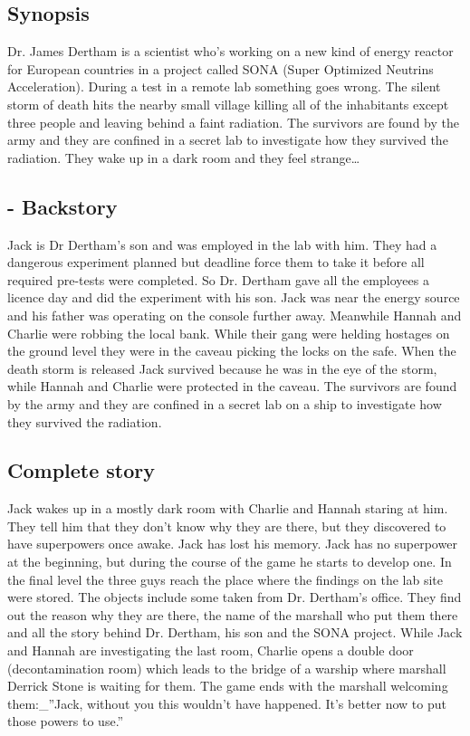 \subsection{Synopsis}
Dr. James Dertham is a scientist who's working on a new kind of energy reactor for European countries in a project called SONA (Super Optimized Neutrins Acceleration). During a test in a remote lab something goes wrong. The silent storm of death hits the nearby small village killing all of the inhabitants except three people and leaving behind a faint radiation.  The survivors are found by the army and they are confined in a secret lab to investigate how they survived the radiation.
They wake up in a dark room and they feel strange… 

\subsection{- Backstory}
Jack is Dr Dertham’s son and was employed in the lab with him. They had a dangerous experiment planned but deadline force them to take it before all required pre-tests were completed. So Dr. Dertham gave all the employees a licence day and did the experiment with his son. Jack was near the energy source and his father was operating on the console further away. Meanwhile Hannah and Charlie were robbing the local bank. While their gang were helding hostages on the ground level they were in the caveau picking the locks on the safe.
When the death storm is released Jack survived because he was in the eye of the storm, while Hannah and Charlie were protected in the caveau. 
The survivors are found by the army and they are confined in a secret lab on a ship to investigate how they survived the radiation.

\subsection{Complete story}
Jack wakes up in a mostly dark room with Charlie and Hannah staring at him. They tell him that they don't know why they are there, but they discovered to have superpowers once awake. Jack has lost his memory. Jack has no superpower at the beginning, but during the course of the game he starts to develop one.
In the final level the three guys reach the place where the findings on the lab site were stored. The objects include some taken from Dr. Dertham’s office. They find out the reason why they are there, the name of the marshall who put them there and all the story behind Dr. Dertham, his son and the SONA project.
While Jack and Hannah are investigating the last room, Charlie opens a double door (decontamination room) which leads to the bridge of a warship where marshall Derrick Stone is waiting for them. The game ends with the marshall welcoming them:_”Jack, without you this wouldn’t have happened. It’s better now to put those powers to use.”


